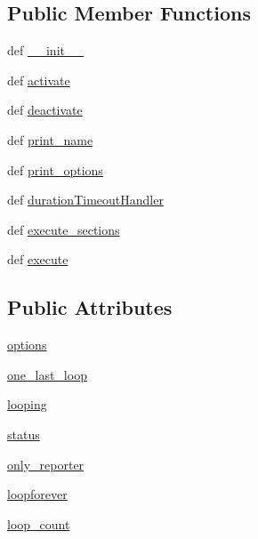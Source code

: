 \subsection*{Public Member Functions}
\begin{DoxyCompactItemize}
\item 
def \hyperlink{classsequential_1_1_sequential_ex_aef3e664b94447607395ba443ef126600}{\-\_\-\-\_\-init\-\_\-\-\_\-}
\item 
def \hyperlink{classsequential_1_1_sequential_ex_a0395a18b172a964a208b5d39e5e6e9cd}{activate}
\item 
def \hyperlink{classsequential_1_1_sequential_ex_ad0324c90b6af183853dc5453341bc166}{deactivate}
\item 
def \hyperlink{classsequential_1_1_sequential_ex_ab82c1f57be3191cc5440df41a989cb90}{print\-\_\-name}
\item 
def \hyperlink{classsequential_1_1_sequential_ex_a1d154cd0643f05739b7f62d14fa3be2f}{print\-\_\-options}
\item 
def \hyperlink{classsequential_1_1_sequential_ex_aba3b7114b70e05ba8980e5fede23fab5}{duration\-Timeout\-Handler}
\item 
def \hyperlink{classsequential_1_1_sequential_ex_aed2735c26fefda4e09918b02bcbcf20a}{execute\-\_\-sections}
\item 
def \hyperlink{classsequential_1_1_sequential_ex_ad0371440bf0b65e8e59249d73d248cc7}{execute}
\end{DoxyCompactItemize}
\subsection*{Public Attributes}
\begin{DoxyCompactItemize}
\item 
\hyperlink{classsequential_1_1_sequential_ex_a72ae94e2c46c2b1b8c5022eaf3593edf}{options}
\item 
\hyperlink{classsequential_1_1_sequential_ex_a3dbe6e22b44436f3fef2c114550ad8ca}{one\-\_\-last\-\_\-loop}
\item 
\hyperlink{classsequential_1_1_sequential_ex_a548a626b1a098a7ad2e0709fc97fa8f7}{looping}
\item 
\hyperlink{classsequential_1_1_sequential_ex_a7f8ca8932ced5d9daf6191598894eb58}{status}
\item 
\hyperlink{classsequential_1_1_sequential_ex_a7c81be8b211e0e01022948ce0a7d4e19}{only\-\_\-reporter}
\item 
\hyperlink{classsequential_1_1_sequential_ex_a8cf719781ed7aa81bb27e30d4281cb66}{loopforever}
\item 
\hyperlink{classsequential_1_1_sequential_ex_a4ba41b6f01a147966df8df335d570d22}{loop\-\_\-count}
\end{DoxyCompactItemize}


